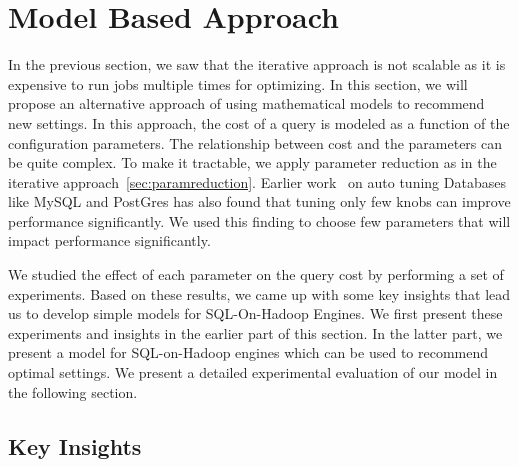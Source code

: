 \section{Model Based Approach}

In the previous section, we saw that the iterative approach is not scalable as it is expensive to run jobs multiple times for optimizing. In this section, we will propose an alternative approach of using mathematical models to recommend new settings. In this approach, the cost of a query is modeled as a function of the configuration parameters. The relationship between cost and the parameters can be quite complex. To make it tractable, we apply parameter reduction as in the iterative approach~\ref{sec:paramreduction}. Earlier work~\cite{VanKen} on auto tuning Databases like MySQL and PostGres has also found that tuning only few knobs can improve performance significantly. We used this finding to choose few parameters that will impact performance significantly. 

We studied the effect of each parameter on the query cost by performing a set of experiments. Based on these results, we came up with some key insights that lead us to develop simple models for SQL-On-Hadoop Engines. We first present these experiments and insights in the earlier part of this section. In the latter part, we present a model for SQL-on-Hadoop engines which can be used to recommend optimal settings. We present a detailed experimental evaluation of our model in the following section.

\subsection{Key Insights}

